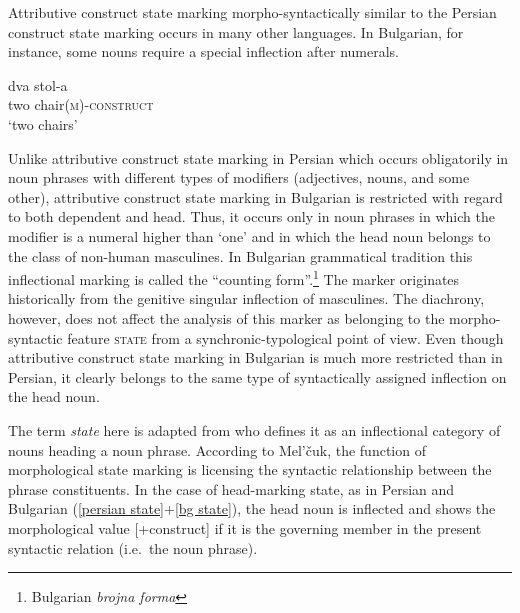Attributive construct state marking morpho-syntactically similar to the Persian construct state marking occurs in many other languages. In Bulgarian, for instance, some nouns require a special inflection after numerals.
\begin{exe}
\label{bg state}
\gll 	dva 	stol-a\\
	two	chair{\textsc{(m)-construct}}\\
\glt 	‘two chairs’
\end{exe}
Unlike attributive construct state marking in Persian which occurs obligatorily in noun phrases with different types of modifiers (adjectives, nouns, and some other), attributive construct state marking in Bulgarian is restricted with regard to both dependent and head. Thus, it occurs only in noun phrases in which the modifier is a numeral higher than ‘one’ and in which the head noun belongs to the class of non-human masculines. In Bulgarian grammatical tradition this inflectional marking is called the “counting form”.\footnote{Bulgarian \emph{brojna forma}} The marker originates historically from the genitive singular inflection of masculines. The diachrony, however, does not affect the analysis of this marker as belonging to the morpho-syntactic feature \textsc{state} from a synchronic-typological point of view. Even though attributive construct state marking in Bulgarian is much more restricted than in Persian, it clearly belongs to the same type of syntactically assigned inflection on the head noun.

The term \emph{state} here is adapted from \citet[114–116]{melcuk2006} who defines it as an inflectional category of nouns heading a noun phrase. According to Mel'čuk, the function of morphological state marking is licensing the syntactic relationship between the phrase constituents. In the case of head-marking state, as in Persian and Bulgarian (\ref{persian state}+\ref{bg state}), the head noun is inflected and shows the morphological value [+construct] if it is the governing member in the present syntactic relation (i.e.~the noun phrase). 

